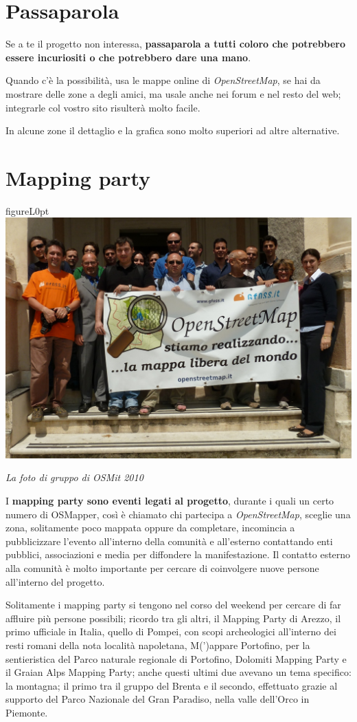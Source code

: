 \documentclass[a4paper,twoside,12pt,]{article}
\newcommand{\osm}{\emph{OpenStreetMap}\xspace}
\begin{document}
\section{Passaparola}
Se a te il progetto non interessa, \textbf{passaparola a tutti coloro che potrebbero essere incuriositi o che potrebbero dare una mano}.

Quando c'è la possibilità, usa le mappe online di \osm, se hai da mostrare delle zone a degli amici, ma usale anche nei forum e nel resto del web; integrarle col vostro sito risulterà molto facile. %
 
In alcune zone il dettaglio e la grafica sono molto superiori ad altre alternative.
\section{Mapping party}
\begin{wrapfloat}{figure}{L}{0pt}
 \includegraphics[width=0.55\columnwidth]{Osmit2010.JPG}
 \caption{\small{\textit{La foto di gruppo di OSMit 2010}}}
\end{wrapfloat}
I \textbf{mapping party sono eventi legati al progetto}, durante i quali un certo numero di OSMapper, così è chiamato chi partecipa a \osm, sceglie una zona, solitamente poco mappata oppure da completare, incomincia a pubblicizzare l'evento all'interno della comunità e all'esterno contattando enti pubblici, associazioni e media per diffondere la manifestazione. Il contatto esterno alla comunità è molto importante per cercare di coinvolgere nuove persone all'interno del progetto.

Solitamente i mapping party si tengono nel corso del weekend per cercare di far affluire più persone possibili; ricordo tra gli altri, il Mapping Party di Arezzo, il primo ufficiale in Italia, quello di Pompei, con scopi archeologici all'interno dei resti romani della nota località napoletana, M(')appare Portofino, per la sentieristica del Parco naturale regionale di Portofino, Dolomiti Mapping Party e il Graian Alps Mapping Party; anche questi ultimi due avevano un tema specifico: la montagna; il primo tra il gruppo del Brenta e il secondo, effettuato grazie al supporto del Parco Nazionale del Gran Paradiso, nella valle dell'Orco in Piemonte.
\end{document}
